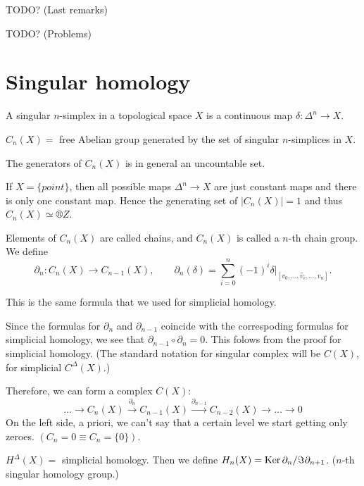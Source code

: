 \documentclass[12pt]{article}					%
\begin{document}
TODO? (Last remarks)


TODO? (Problems)


\section{Singular homology}
\begin{definice}
	A singular $n$-simplex in a topological space $X$ is a continuous map $δ: Δ^n \rightarrow X$.

	$C_n(X)=$ free Abelian group generated by the set of singular $n$-simplices in $X$.

	\begin{poznamkain}
		The generators of $C_n(X)$ is in general an uncountable set.

		If $X = \{point\}$, then all possible maps $Δ^n \rightarrow X$ are just constant maps and there is only one constant map. Hence the generating set of $|C_n(X)| = 1$ and thus $C_n(X) \simeq ®Z$.
	\end{poznamkain}

	Elements of $C_n(X)$ are called chains, and $C_n(X)$ is called a $n$-th chain group. We define
	$$ \partial_n: C_n(X) \rightarrow C_{n-1}(X), \qquad \partial_n(δ) = \sum_{i=0}^n (-1)^i δ|_{[v_0, …, \hat{v}_i, …, v_n]}. $$

	\begin{poznamkain}
		This is the same formula that we used for simplicial homology.

		Since the formulas for $\partial_n$ and $\partial_{n-1}$ coincide with the correspoding formulas for simplicial homology, we see that $\partial_{n-1} ∘ \partial_n = 0$. This folows from the proof for simplicial homology. (The standard notation for singular complex will be $C(X)$, for simplicial $C^Δ(X)$.)

		Therefore, we can form a complex $C(X)$:
		$$ … \rightarrow C_n(X) \overset{\partial_n}\rightarrow C_{n-1}(X) \overset{\partial_{n-1}}\rightarrow C_{n-2}(X) \rightarrow … \rightarrow 0 $$
		On the left side, a priori, we can't say that a certain level we start getting only zeroes. $(C_n = 0 ≡ C_n = \{0\}).$
	\end{poznamkain}

	$H^Δ(X) = $ simplicial homology. Then we define $H_n(X) = \operatorname{Ker} \partial_n / \Im \partial_{n+1}$. ($n$-th singular homology group.)
\end{definice}
\end{document}
